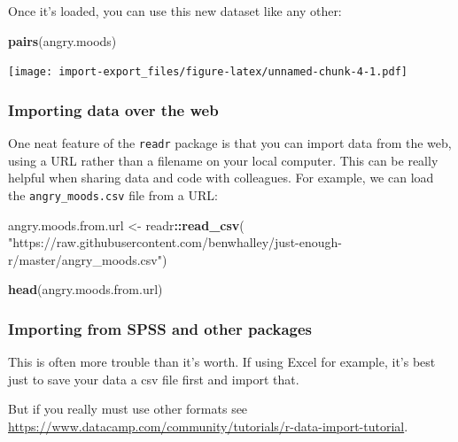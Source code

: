 \documentclass[]{article}
\newenvironment{Shaded}{\begin{snugshade}}{\end{snugshade}}
\newcommand{\KeywordTok}[1]{\textcolor[rgb]{0.13,0.29,0.53}{\textbf{#1}}}
\newcommand{\NormalTok}[1]{#1}
\newcommand{\OperatorTok}[1]{\textcolor[rgb]{0.81,0.36,0.00}{\textbf{#1}}}
\newcommand{\StringTok}[1]{\textcolor[rgb]{0.31,0.60,0.02}{#1}}
\begin{document}
Once it's loaded, you can use this new dataset like any other:

\begin{Shaded}
\begin{Highlighting}[]
\KeywordTok{pairs}\NormalTok{(angry.moods)}
\end{Highlighting}
\end{Shaded}

\texttt{[image: import-export\_files/figure-latex/unnamed-chunk-4-1.pdf]}

\hypertarget{importing-data-from-the-web}{%
\subsubsection*{Importing data over the web}\label{importing-data-from-the-web}}

One neat feature of the \texttt{readr} package is that you can import data from the
web, using a URL rather than a filename on your local computer. This can be
really helpful when sharing data and code with colleagues. For example, we can
load the \texttt{angry\_moods.csv} file from a URL:

\begin{Shaded}
\begin{Highlighting}[]
\NormalTok{angry.moods.from.url <-}\StringTok{ }\NormalTok{readr}\OperatorTok{::}\KeywordTok{read_csv}\NormalTok{(}
  \StringTok{"https://raw.githubusercontent.com/benwhalley/just-enough-r/master/angry_moods.csv"}\NormalTok{)}

\KeywordTok{head}\NormalTok{(angry.moods.from.url)}
\end{Highlighting}
\end{Shaded}

\hypertarget{importing-proprietary-formats}{%
\subsubsection*{Importing from SPSS and other packages}\label{importing-proprietary-formats}}

This is often more trouble than it's worth. If using Excel for example, it's
best just to save your data a csv file first and import that.

But if you really must use other formats see
\url{https://www.datacamp.com/community/tutorials/r-data-import-tutorial}.
\end{document}
